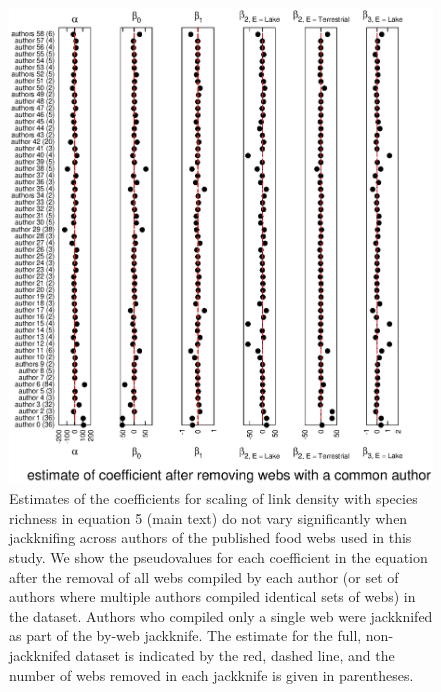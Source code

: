 \documentclass[12pt]{article}
\begin{document}
    \begin{figure}[!h]
    \centerline{\includegraphics*[height=.75\textheight]{Figures/Jackknife/LS_author.eps}}
    \caption{Estimates of the coefficients for scaling of link density with species richness
    in equation 5 (main text) do not vary significantly
    when jackknifing across authors of the published food webs used in this study. 
    We show the pseudovalues for each coefficient
    in the equation after the removal of all webs compiled by each author (or set of authors where
    multiple authors compiled identical sets of webs) in the dataset. Authors
    who compiled only a single web were jackknifed as part of the by-web jackknife.
    The estimate for the full, non-jackknifed dataset is indicated by the red, dashed line, and
    the number of webs removed in each jackknife is given in parentheses.}
    \label{LS_auth}
    \end{figure}

  \newpage
\end{document}

